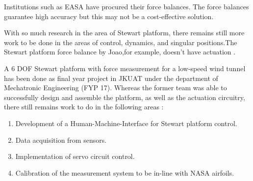Institutions such as EASA have procured their force balances. The force balances guarantee high accuracy but this may not be a cost-effective solution.

With so much research in the area of Stewart platform, there remains still more work to be done in the areas of control, dynamics, and singular positions.The Stewart platform force balance by Joao,for example, doesn't have actuation \cite{ferreira2015design}. 

A 6 DOF Stewart platform with force measurement for a low-speed wind tunnel has been done as final year project in JKUAT under the department of Mechatronic Engineering (FYP 17). Whereas the former team was able to successfully design and assemble the platform, as well as the actuation circuitry, there still remains work to do in the following areas \cite{caleb}:
\begin{enumerate}
\item Development of a Human-Machine-Interface for Stewart platform control.
\item Data acquisition from sensors.
\item Implementation of servo circuit control.
\item Calibration of the measurement system to be in-line with NASA airfoils.
\end{enumerate}